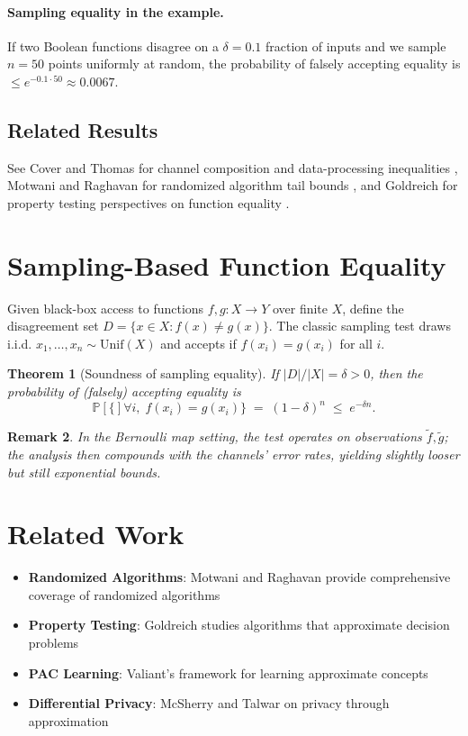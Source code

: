 \documentclass[11pt,final,hidelinks]{article}
\newtheorem{theorem}{Theorem}[section]
\newtheorem{remark}[theorem]{Remark}
\newcommand{\obs}[1]{\widetilde{#1}}  %
\newcommand{\Prob}[1]{\mathbb{P}\left[#1\right]}
\begin{document}
\paragraph{Sampling equality in the example.} If two Boolean functions disagree on a $\delta=0.1$ fraction of inputs and we sample $n=50$ points uniformly at random, the probability of falsely accepting equality is $\le e^{-0.1\cdot 50} \approx 0.0067$.

\subsection{Related Results}
See Cover and Thomas for channel composition and data-processing inequalities \cite{cover2006}, Motwani and Raghavan for randomized algorithm tail bounds \cite{motwani1995}, and Goldreich for property testing perspectives on function equality \cite{goldreich2017}.

\section{Sampling-Based Function Equality}

Given black-box access to functions $f,g:X\to Y$ over finite $X$, define the disagreement set $D=\{x\in X: f(x)\neq g(x)\}$. The classic sampling test draws i.i.d. $x_1,\dots,x_n\sim\mathrm{Unif}(X)$ and accepts if $f(x_i)=g(x_i)$ for all $i$.

\begin{theorem}[Soundness of sampling equality]
If $|D|/|X|=\delta>0$, then the probability of (falsely) accepting equality is
\begin{equation}
\Prob\{ \forall i,\; f(x_i)=g(x_i) \} \;=\; (1-\delta)^n \;\le\; e^{-\delta n}.
\end{equation}
\end{theorem}

\begin{remark}
In the Bernoulli map setting, the test operates on observations $\obs{f},\obs{g}$; the analysis then compounds with the channels' error rates, yielding slightly looser but still exponential bounds.
\end{remark}

\section{Related Work}

\begin{itemize}
    \item \textbf{Randomized Algorithms}: Motwani and Raghavan \cite{motwani1995} provide comprehensive coverage of randomized algorithms
    \item \textbf{Property Testing}: Goldreich \cite{goldreich2017} studies algorithms that approximate decision problems
    \item \textbf{PAC Learning}: Valiant's framework \cite{valiant1984} for learning approximate concepts
    \item \textbf{Differential Privacy}: McSherry and Talwar \cite{mcsherry2007} on privacy through approximation
\end{itemize}
\end{document}
